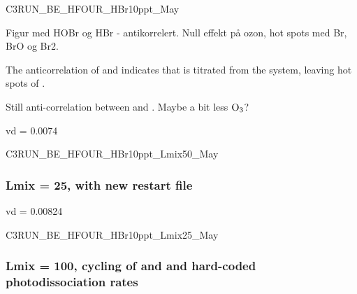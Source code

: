 






C3RUN\_BE\_HFOUR\_HBr10ppt\_May

Figur med HOBr og HBr - antikorrelert. Null effekt på ozon, hot spots med Br, BrO og Br2. 

The anticorrelation of  and  indicates that  is titrated from the system, leaving hot spots of . 


Still anti-correlation between  and . Maybe a bit less $\mathrm{O_3}$? 

vd = 0.0074 

C3RUN\_BE\_HFOUR\_HBr10ppt\_Lmix50\_May

\subsubsection{Lmix = 25, with new restart file}

vd = 0.00824

C3RUN\_BE\_HFOUR\_HBr10ppt\_Lmix25\_May


\subsubsection{Lmix = 100, cycling of  and  and hard-coded photodissociation rates}

